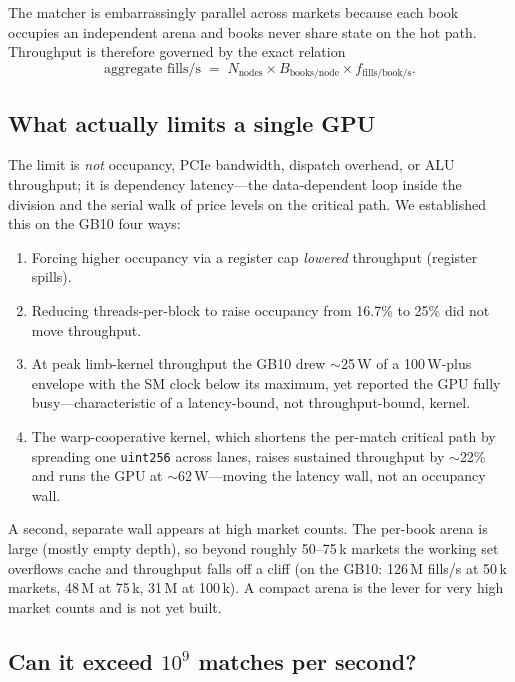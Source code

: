 The matcher is embarrassingly parallel across markets because each book occupies an
independent arena and books never share state on the hot path. Throughput is therefore
governed by the exact relation
\begin{equation}
  \text{aggregate fills/s} \;=\; N_{\text{nodes}} \times B_{\text{books/node}}
    \times f_{\text{fills/book/s}}.
  \label{eq:aggregate}
\end{equation}

\subsection{What actually limits a single GPU}

The limit is \emph{not} occupancy, PCIe bandwidth, dispatch overhead, or ALU throughput;
it is dependency latency---the data-dependent loop inside the division and the serial walk
of price levels on the critical path. We established this on the GB10 four ways:

\begin{enumerate}
  \item Forcing higher occupancy via a register cap \emph{lowered} throughput (register
  spills).
  \item Reducing threads-per-block to raise occupancy from 16.7\% to 25\% did not move
  throughput.
  \item At peak limb-kernel throughput the GB10 drew $\sim$25\,W of a 100\,W-plus envelope
  with the SM clock below its maximum, yet reported the GPU fully busy---characteristic of a
  latency-bound, not throughput-bound, kernel.
  \item The warp-cooperative kernel, which shortens the per-match critical path by spreading
  one \texttt{uint256} across lanes, raises sustained throughput by $\sim$22\% and runs the
  GPU at $\sim$62\,W---moving the latency wall, not an occupancy wall.
\end{enumerate}

A second, separate wall appears at high market counts. The per-book arena is large (mostly
empty depth), so beyond roughly 50--75\,k markets the working set overflows cache and
throughput falls off a cliff (on the GB10: 126\,M fills/s at 50\,k markets, 48\,M at 75\,k,
31\,M at 100\,k). A compact arena is the lever for very high market counts and is not yet
built.

\subsection{Can it exceed $10^{9}$ matches per second?}
\label{subsec:billion-matching}

